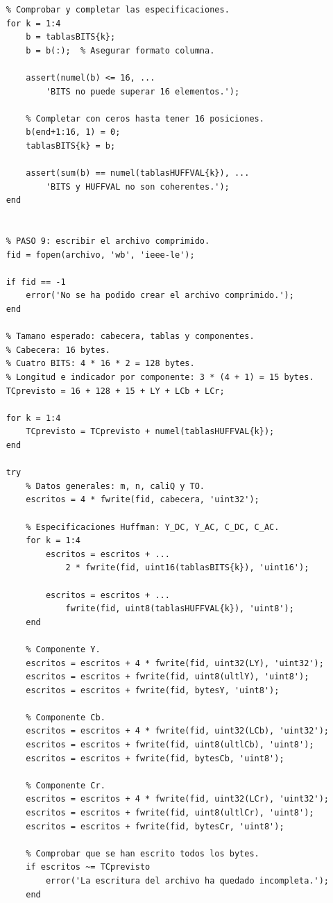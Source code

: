 \documentclass[11pt,a4paper,oneside]{report}
\begin{document}
\begin{lstlisting}
    % Comprobar y completar las especificaciones.
    for k = 1:4
        b = tablasBITS{k};
        b = b(:);  % Asegurar formato columna.

        assert(numel(b) <= 16, ...
            'BITS no puede superar 16 elementos.');

        % Completar con ceros hasta tener 16 posiciones.
        b(end+1:16, 1) = 0;
        tablasBITS{k} = b;

        assert(sum(b) == numel(tablasHUFFVAL{k}), ...
            'BITS y HUFFVAL no son coherentes.');
    end


    % PASO 9: escribir el archivo comprimido.
    fid = fopen(archivo, 'wb', 'ieee-le');

    if fid == -1
        error('No se ha podido crear el archivo comprimido.');
    end

    % Tamano esperado: cabecera, tablas y componentes.
    % Cabecera: 16 bytes.
    % Cuatro BITS: 4 * 16 * 2 = 128 bytes.
    % Longitud e indicador por componente: 3 * (4 + 1) = 15 bytes.
    TCprevisto = 16 + 128 + 15 + LY + LCb + LCr;

    for k = 1:4
        TCprevisto = TCprevisto + numel(tablasHUFFVAL{k});
    end

    try
        % Datos generales: m, n, caliQ y TO.
        escritos = 4 * fwrite(fid, cabecera, 'uint32');

        % Especificaciones Huffman: Y_DC, Y_AC, C_DC, C_AC.
        for k = 1:4
            escritos = escritos + ...
                2 * fwrite(fid, uint16(tablasBITS{k}), 'uint16');

            escritos = escritos + ...
                fwrite(fid, uint8(tablasHUFFVAL{k}), 'uint8');
        end

        % Componente Y.
        escritos = escritos + 4 * fwrite(fid, uint32(LY), 'uint32');
        escritos = escritos + fwrite(fid, uint8(ultlY), 'uint8');
        escritos = escritos + fwrite(fid, bytesY, 'uint8');

        % Componente Cb.
        escritos = escritos + 4 * fwrite(fid, uint32(LCb), 'uint32');
        escritos = escritos + fwrite(fid, uint8(ultlCb), 'uint8');
        escritos = escritos + fwrite(fid, bytesCb, 'uint8');

        % Componente Cr.
        escritos = escritos + 4 * fwrite(fid, uint32(LCr), 'uint32');
        escritos = escritos + fwrite(fid, uint8(ultlCr), 'uint8');
        escritos = escritos + fwrite(fid, bytesCr, 'uint8');

        % Comprobar que se han escrito todos los bytes.
        if escritos ~= TCprevisto
            error('La escritura del archivo ha quedado incompleta.');
        end


\end{lstlisting}
\end{document}
